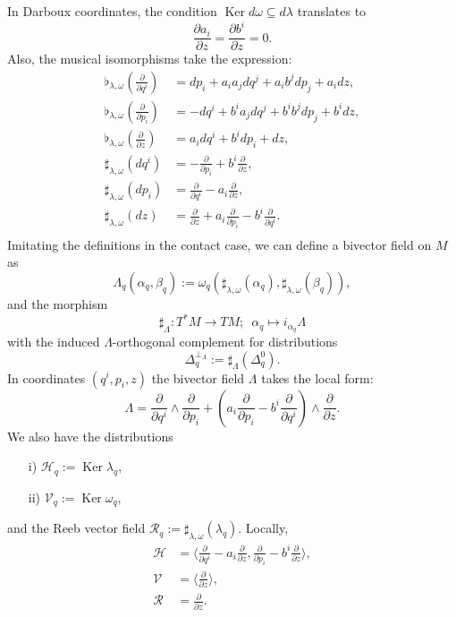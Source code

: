 \documentclass[12pt]{article}
\renewcommand{\ker}{\operatorname{Ker}}
\newcommand{\partder}[2]{\frac{\partial #1}{\partial #2}}
\begin{document}
In Darboux coordinates, the condition $\ker  d\omega \subseteq d\lambda$ translates to $$\partder{a_ i}{z} = \partder{b^i}{z} = 0.$$ Also, the musical isomorphisms take the expression:
\begin{align*}
    \flat_{\lambda, \omega}\left (\partder{}{q^i}\right ) &= dp_i + a_i a_j dq^j + a_i b^j dp_j + a_i dz,\\
    \flat_{\lambda, \omega} \left (\partder{}{p_i}\right ) &= -dq^i + b^i a_j dq^j + b^ib^j dp_j + b^i dz,\\
    \flat_{\lambda, \omega}\left (\partder{}{z} \right) &= a_ i dq^i + b^i dp_i + dz,\\
    \sharp_{\lambda, \omega} \left( dq^i\right) &= - \partder{}{p_i} + {b^i} \partder{}{z},\\
    \sharp_{\lambda, \omega} \left( dp_i\right) &= \partder{}{q^i} - {a_ i} \partder{}{z},\\
    \sharp_{\lambda, \omega} \left(dz \right) &= \partder{}{z} + {a_i} \partder{}{p_i} - {b^i} \partder{}{q^i}.\\
\end{align*}
Imitating the definitions in the contact case, we can define a bivector field on $M$ as $$\Lambda_q(\alpha_q, \beta_q) := \omega_q(\sharp_{\lambda, \omega}(\alpha_q), \sharp_{\lambda, \omega}(\beta_q)),$$ and the morphism $$\sharp_\Lambda: T^*M \rightarrow TM; \,\,\, \alpha_q \mapsto i_{\alpha_q} \Lambda$$ with the induced $\Lambda$-orthogonal complement for distributions $$\Delta_q^{\perp_\Lambda} := \sharp_\Lambda(\Delta_q^0).$$ In coordinates $(q^i, p_i, z)$ the bivector field $\Lambda$ takes the local form: $$\Lambda = \partder{}{q^i} \wedge \partder{}{p_ i} + \left( {a_ i} \partder{}{p_ i} - {b^i} \partder{}{q^i} \right) \wedge  \partder{}{z}.$$
We also have the distributions 
\begin{itemize}
\item[i)] $\mathcal{H}_q:= \ker \lambda_q,$
\item[ii)] $ \mathcal{V}_q:= \ker \omega_q,$
\end{itemize}
and the Reeb vector field $\mathcal{R}_q := \sharp_{\lambda, \omega}(\lambda_q).$ Locally, 
\begin{align}
    \mathcal{H} &= \langle \partder{}{q^i} - {a_i} \partder{}{z}, \partder{}{p_i} - {b^i} \partder{}{z}\rangle,\\
    \mathcal{V} &= \langle  \partder{}{z}\rangle, \\
    \mathcal{R} &=  \partder{}{z}.
\end{align}
\end{document}
